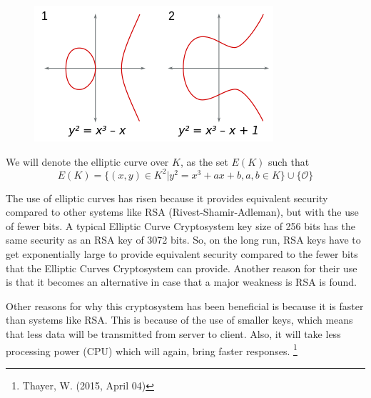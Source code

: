 \begin{figure}
    \centering
    \includegraphics{Figures/ECClines-3.jpg}
    \caption{}
    \label{fig:my_label}
\end{figure}

We will denote the elliptic curve over $K$, as the set $E(K)$ such that
\begin{equation}
    E(K)=\{(x,y) \in K^2 | y^2=x^3+ax+b, a,b \in K\} \cup \{\mathcal{O}\}
\end{equation}


\hspace{10mm} The use of elliptic curves has risen because it provides equivalent security compared to other systems like RSA (Rivest-Shamir-Adleman), but with the use of fewer bits. A typical Elliptic Curve Cryptosystem key size of 256 bits has the same security as an RSA key of 3072 bits. So, on the long run, RSA keys have to get exponentially large to provide equivalent security compared to the fewer bits that the Elliptic Curves Cryptosystem can provide. Another reason for their use is that it becomes an alternative in case that a major weakness is RSA is found. 

\hspace{10mm}  Other reasons for why this cryptosystem has been beneficial is because it is faster than systems like RSA. This is because of the use of smaller keys, which means that less data will be transmitted from server to client. Also, it will take less processing power (CPU) which will again, bring faster responses. \footnote{Thayer, W. (2015, April 04)}


